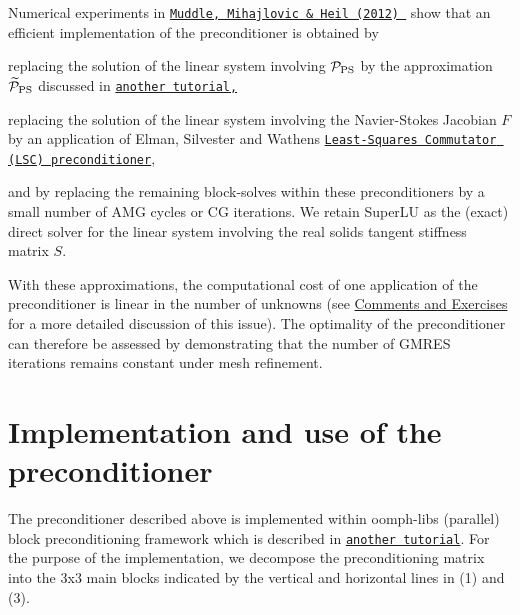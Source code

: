 Numerical experiments in \href{http://dx.doi.org/10.1016/j.jcp.2012.07.001}{\tt Muddle, Mihajlovic \& Heil (2012) } show that an efficient implementation of the preconditioner is obtained by
\begin{DoxyItemize}
\item replacing the solution of the linear system involving ${\cal P}_{\rm PS}$ by the approximation $\widetilde{\cal P}_{\rm PS}$ discussed in \href{../../prescribed_displ_lagr_mult/html/index.html}{\tt another tutorial,} ~\newline
~\newline

\item replacing the solution of the linear system involving the Navier-\/\+Stokes Jacobian $ F $ by an application of Elman, Silvester and Wathen\textquotesingle{}s \href{../../lsc_navier_stokes/html/index.html}{\tt Least-\/\+Squares Commutator (L\+SC) preconditioner},
\end{DoxyItemize}and by replacing the remaining block-\/solves within these preconditioners by a small number of A\+MG cycles or CG iterations. We retain Super\+LU as the (exact) direct solver for the linear system involving the real solid\textquotesingle{}s tangent stiffness matrix $ S $.

With these approximations, the computational cost of one application of the preconditioner is linear in the number of unknowns (see \hyperlink{index_comm_and_ex}{Comments and Exercises} for a more detailed discussion of this issue). The optimality of the preconditioner can therefore be assessed by demonstrating that the number of G\+M\+R\+ES iterations remains constant under mesh refinement.



 

\hypertarget{index_implementation}{}\section{Implementation and use of the preconditioner}\label{index_implementation}
The preconditioner described above is implemented within {\ttfamily oomph-\/lib\textquotesingle{}s} (parallel) block preconditioning framework which is described in \href{../../../mpi/block_preconditioners/html/index.html}{\tt another tutorial}. For the purpose of the implementation, we decompose the preconditioning matrix into the 3x3 main blocks indicated by the vertical and horizontal lines in (1) and (3).

